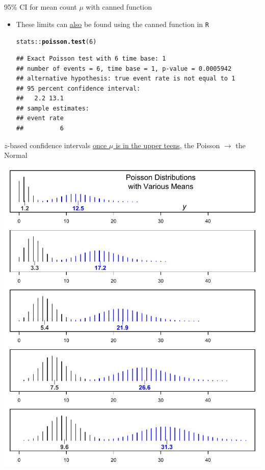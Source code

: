 \documentclass[10pt,handout]{beamer}\usepackage[]{graphicx}\usepackage[]{color}
\makeatletter
\newcommand{\hlnum}[1]{\textcolor[rgb]{0.686,0.059,0.569}{#1}}%
\newcommand{\hlopt}[1]{\textcolor[rgb]{0,0,0}{#1}}%
\newcommand{\hlstd}[1]{\textcolor[rgb]{0.345,0.345,0.345}{#1}}%
\newcommand{\hlkwd}[1]{\textcolor[rgb]{0.737,0.353,0.396}{\textbf{#1}}}%
\newenvironment{kframe}{%
 \def\at@end@of@kframe{}%
 \ifinner\ifhmode%
  \def\at@end@of@kframe{\end{minipage}}%
  \begin{minipage}{\columnwidth}%
 \fi\fi%
 \def\FrameCommand##1{\hskip\@totalleftmargin \hskip-\fboxsep
 \colorbox{shadecolor}{##1}\hskip-\fboxsep
     \hskip-\linewidth \hskip-\@totalleftmargin \hskip\columnwidth}%
 \MakeFramed {\advance\hsize-\width
   \@totalleftmargin\z@ \linewidth\hsize
   \@setminipage}}%
 {\par\unskip\endMakeFramed%
 \at@end@of@kframe}
\newenvironment{knitrout}{}{} %
\makeatother
\begin{document}
\begin{frame}[fragile]{95\% CI for mean count $\mu$ with canned function}
	\begin{itemize}
		\setlength\itemsep{1em}
		\item These limits can \underline{also} be found using  the canned function in \texttt{R} 
		
\begin{knitrout}\tiny
{}\color{fgcolor}\begin{kframe}
\begin{alltt}
\hlstd{stats}\hlopt{::}\hlkwd{poisson.test}\hlstd{(}\hlnum{6}\hlstd{)}
\end{alltt}
\begin{verbatim}
## Exact Poisson test with 6 time base: 1 
## number of events = 6, time base = 1, p-value = 0.0005942
## alternative hypothesis: true event rate is not equal to 1 
## 95 percent confidence interval:
##   2.2 13.1 
## sample estimates:
## event rate 
##          6
\end{verbatim}
\end{kframe}
\end{knitrout}
		
	\end{itemize}
\end{frame}



\begin{frame}{$z$-based confidence intervals}
	\scriptsize
	\underline{once $\mu$ is in the upper teens}, the Poisson $\to$ the Normal
	
	\centering
	\includegraphics[scale=0.5]{Shapes.pdf}
	
\end{frame}
\end{document}

